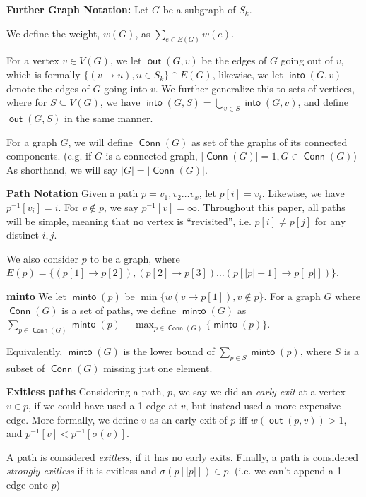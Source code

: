 \documentclass{article}
\DeclareMathOperator{\minto}{\bm{\mathsf{minto}}}
\DeclareMathOperator{\out}{\bm{\mathsf{out}}}
\DeclareMathOperator{\into}{\bm{\mathsf{into}}}
\DeclareMathOperator{\Conn}{\bm{\mathsf{Conn}}}
\newcommand{\dc}[1]{}%
\begin{document}
\vspace{1.75em}

\textbf{Further Graph Notation:} Let $G$ be a subgraph of $S_k$.

We define the weight, $w(G)$, as $\sum_{e \in E(G)} w(e)$.

For a vertex $v \in V(G)$, we let $\out(G,v)$ be the edges of $G$ going out of $v$, which is formally $\{(v\to u), u \in S_k\} \cap E(G)$, likewise, we let $\into(G,v)$ denote the edges of $G$ going into $v$. We further generalize this to sets of vertices, where for $S \subseteq V(G)$, we have $\into(G,S) = \bigcup_{v \in S} \into(G,v)$, and define $\out(G,S)$ in the same manner.

For a graph $G$, we will define $\Conn(G)$\dc{ make this a custom function} as set of the graphs of its connected components. (e.g. if $G$ is a connected graph, $|\Conn(G)| = 1, G \in \Conn(G)$) As shorthand, we will say $|G| = |\Conn(G)|$.

\vspace{1.75em}

\textbf{Path Notation} Given a path $p = v_1,v_2 \dots v_x$, let $p[i] = v_i$. Likewise, we have $p^{-1}[v_i] =i$. For $v \not \in p$, we say $p^{-1}[v] = \infty$. Throughout this paper, all paths will be simple, meaning that no vertex is ``revisited'', i.e. $p[i]\neq p[j]$ for any distinct $i,j$.

We also consider $p$ to be a graph, where $E(p) = \{(p[1] \to p[2]),(p[2] \to p[3])\dots (p[|p|-1] \to p[|p|])\}$.

\vspace{1.75em}

\textbf{minto} We let $\minto(p)$ be $\min\{ w(v \to p[1]), v \not \in p\}$. For a graph $G$ where $\Conn(G)$ is a set of paths, we define $\minto(G)$ as $\sum_{p \in \Conn(G)} \minto(p) - \max_{p \in \Conn(G)}\{\minto(p)\}$.

Equivalently, $\minto(G)$ is the lower bound of $\sum_{p \in S} \minto(p)$, where $S$ is a subset of $\Conn(G)$ missing just one element.

\vspace{1.75em}

\textbf{Exitless paths} Considering a path, $p$, we say we did an \textit{early exit} at a vertex $v \in p$, if we could have used a 1-edge at $v$, but instead used a more expensive edge. More formally, we define $v$ as an early exit of $p$ iff $w(\out(p,v)) > 1$, and $p^{-1}[v] < p^{-1}[\sigma(v)]$.

A path is considered \textit{exitless}, if it has no early exits. Finally, a path is considered \textit{strongly exitless} if it is exitless and $\sigma(p[|p|]) \in p$. (i.e. we can't append a 1-edge onto $p$)
\end{document}
